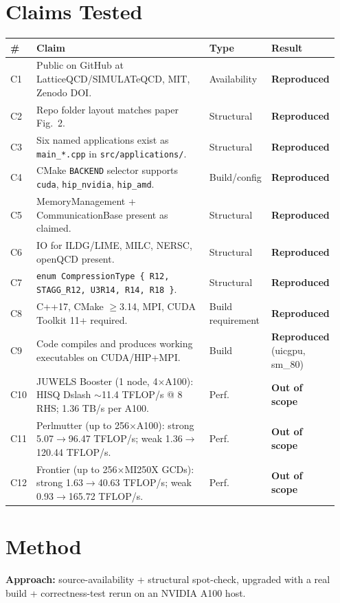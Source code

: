 \documentclass[11pt]{article}
\begin{document}
\section{Claims Tested}
\begin{longtable}{@{}p{0.05\linewidth}p{0.55\linewidth}p{0.15\linewidth}p{0.20\linewidth}@{}}
\toprule
\# & Claim & Type & Result \\
\midrule
\endhead
C1  & Public on GitHub at LatticeQCD/SIMULATeQCD, MIT, Zenodo DOI. & Availability & \textbf{Reproduced} \\
C2  & Repo folder layout matches paper Fig.~2. & Structural & \textbf{Reproduced} \\
C3  & Six named applications exist as \texttt{main\_*.cpp} in \texttt{src/applications/}. & Structural & \textbf{Reproduced} \\
C4  & CMake \texttt{BACKEND} selector supports \texttt{cuda}, \texttt{hip\_nvidia}, \texttt{hip\_amd}. & Build/config & \textbf{Reproduced} \\
C5  & MemoryManagement + CommunicationBase present as claimed. & Structural & \textbf{Reproduced} \\
C6  & IO for ILDG/LIME, MILC, NERSC, openQCD present. & Structural & \textbf{Reproduced} \\
C7  & \texttt{enum CompressionType \{ R12, STAGG\_R12, U3R14, R14, R18 \}}. & Structural & \textbf{Reproduced} \\
C8  & C++17, CMake $\geq$3.14, MPI, CUDA Toolkit 11+ required. & Build requirement & \textbf{Reproduced} \\
C9  & Code compiles and produces working executables on CUDA/HIP+MPI. & Build & \textbf{Reproduced} (uicgpu, sm\_80) \\
C10 & JUWELS Booster (1 node, 4$\times$A100): HISQ Dslash $\sim$11.4 TFLOP/s @ 8 RHS; 1.36 TB/s per A100. & Perf. & \textbf{Out of scope} \\
C11 & Perlmutter (up to 256$\times$A100): strong 5.07$\rightarrow$96.47 TFLOP/s; weak 1.36$\rightarrow$120.44 TFLOP/s. & Perf. & \textbf{Out of scope} \\
C12 & Frontier (up to 256$\times$MI250X GCDs): strong 1.63$\rightarrow$40.63 TFLOP/s; weak 0.93$\rightarrow$165.72 TFLOP/s. & Perf. & \textbf{Out of scope} \\
\bottomrule
\end{longtable}

\section{Method}
\textbf{Approach:} source-availability + structural spot-check, upgraded with a real build + correctness-test rerun on an NVIDIA A100 host.
\end{document}

